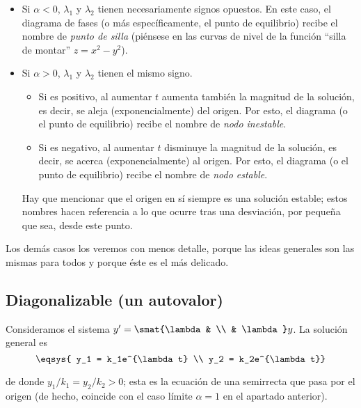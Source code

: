 \documentclass[../ecuaciones_diferenciales.tex]{subfiles}
\begin{document}
\begin{itemize}
	\item Si \(\alpha < 0\), \(\lambda_1\) y \(\lambda_2\) tienen necesariamente
	      signos opuestos. En este caso, el diagrama de fases (o más específicamente, el
	      punto de equilibrio) recibe el nombre de \emph{punto de silla} (piénsese en
	      las curvas de nivel de la función ``silla de montar'' \(z = x^2 - y^2\)).

	\item Si \(\alpha > 0\), \(\lambda_1\) y \(\lambda_2\) tienen el mismo signo.
	      \begin{itemize}
		      \item Si es positivo, al aumentar \(t\) aumenta también la magnitud de la
		            solución, es decir, se aleja (exponencialmente) del origen. Por esto, el
		            diagrama (o el punto de equilibrio) recibe el nombre de \emph{nodo
			            inestable}.
		      \item Si es negativo, al aumentar \(t\) disminuye la magnitud de la solución,
		            es decir, se acerca (exponencialmente) al origen. Por esto, el diagrama (o
		            el punto de equilibrio) recibe el nombre de \emph{nodo estable}.
	      \end{itemize}
	      Hay que mencionar que el origen en sí siempre es una solución estable; estos
	      nombres hacen referencia a lo que ocurre tras una desviación, por pequeña que
	      sea, desde este punto.
\end{itemize}

Los demás casos los veremos con menos detalle, porque las ideas generales son
las mismas para todos y porque éste es el más delicado.

\subsection{Diagonalizable (un autovalor)}

Consideramos el sistema \(y' = \smat{\lambda & \\ & \lambda} y\). La solución
general es
\[\eqsys{
	y_1 = k_1e^{\lambda t} \\
	y_2 = k_2e^{\lambda t}}\]

de donde \(y_1/k_1 = y_2/k_2 > 0\); esta es la ecuación de una semirrecta que
pasa por el origen (de hecho, coincide con el caso límite \(\alpha = 1\) en el
apartado anterior).
\end{document}
